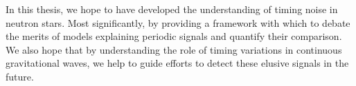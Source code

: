 \documentclass[twoside, 11pt]{thesis}
\begin{document}
In this thesis, we hope to have developed the understanding of timing noise in
neutron stars. Most significantly, by providing a framework with which to debate
the merits of models explaining periodic signals and quantify their comparison.
We also hope that by understanding the role of timing variations in continuous
gravitational waves, we help to guide efforts to detect these elusive signals
in the future.







\end{document}
